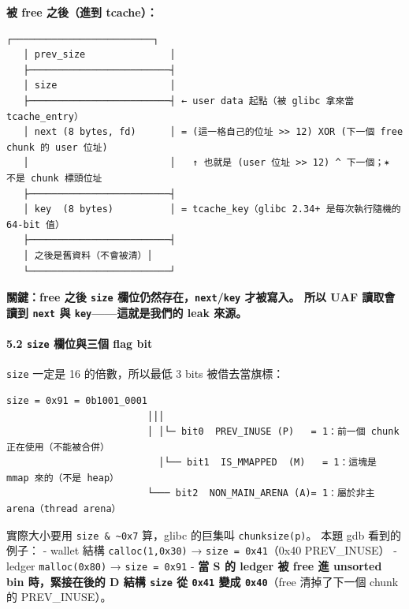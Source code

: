 \documentclass[10pt,a4paper]{article}
\renewenvironment{quote}{%
  \begin{mdframed}[linewidth=0pt,innerleftmargin=0pt,innerrightmargin=0pt,
    innerbottommargin=0pt,innertopmargin=0pt,skipabove=0.55em,skipbelow=0.55em,
    leftmargin=0.9em,rightmargin=0.4em,startcode={\color{quotebar}\vrule width 2.6pt},%
    endcode={}]%
  \itshape\color{black}%
}{%
  \end{mdframed}%
}
\begin{document}
\textbf{被 free 之後（進到 tcache）：}

\begin{Verbatim}[breaklines=true,breakanywhere=true,breakautoindent=false,fontsize=\fontsize{7.0}{9.5}\selectfont]
   ┌─────────────────────────┐
   │ prev_size               │
   ├─────────────────────────┤
   │ size                    │
   ├─────────────────────────┤ ← user data 起點（被 glibc 拿來當 tcache_entry）
   │ next (8 bytes, fd)      │ = (這一格自己的位址 >> 12) XOR (下一個 free chunk 的 user 位址)
   │                         │   ↑ 也就是 (user 位址 >> 12) ^ 下一個；✶ 不是 chunk 標頭位址
   ├─────────────────────────┤
   │ key  (8 bytes)          │ = tcache_key（glibc 2.34+ 是每次執行隨機的 64-bit 值）
   ├─────────────────────────┤
   │ 之後是舊資料（不會被清）│
   └─────────────────────────┘
\end{Verbatim}

\begin{quote}
\textbf{關鍵：free 之後 \texttt{size}
欄位仍然存在，\texttt{next}/\texttt{key} 才被寫入。 所以 UAF 讀取會讀到
\texttt{next} 與 \texttt{key}------這就是我們的 leak 來源。}
\end{quote}

\paragraph{\texorpdfstring{5.2 \texttt{size} 欄位與三個 flag
bit}{5.2 size 欄位與三個 flag bit}}\label{size-ux6b04ux4f4dux8207ux4e09ux500b-flag-bit}

\texttt{size} 一定是 16 的倍數，所以最低 3 bits 被借去當旗標：

\begin{Verbatim}[breaklines=true,breakanywhere=true,breakautoindent=false,fontsize=\fontsize{7.0}{9.5}\selectfont]
   size = 0x91 = 0b1001_0001
                         │││
                         │ │└─ bit0  PREV_INUSE (P)   = 1：前一個 chunk 正在使用（不能被合併）
                           │└── bit1  IS_MMAPPED  (M)   = 1：這塊是 mmap 來的（不是 heap）
                         └─── bit2  NON_MAIN_ARENA (A)= 1：屬於非主 arena（thread arena）
\end{Verbatim}

實際大小要用 \texttt{size\ \allowbreak{}\&\allowbreak{}\ \allowbreak{}\textasciitilde{}\allowbreak{}0x7} 算，glibc 的巨集叫
\texttt{chunksize(p)}。 本題 gdb 看到的例子： - wallet 結構
\texttt{calloc(1,\allowbreak{}0x30)} → \texttt{size\ \allowbreak{}=\ \allowbreak{}0x41}（0x40 \textbar{}
PREV\_INUSE） - ledger \texttt{malloc(0x80)} → \texttt{size\ \allowbreak{}=\ \allowbreak{}0x91} -
\textbf{當 S 的 ledger 被 free 進 unsorted bin 時，緊接在後的 D 結構
\texttt{size} 從 \texttt{0x41} 變成 \texttt{0x40}}（free 清掉了下一個
chunk 的 PREV\_INUSE）。
\end{document}
